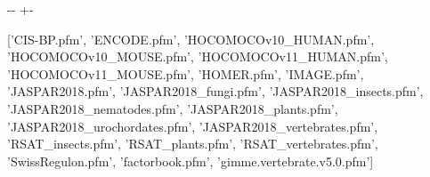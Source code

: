 \documentclass[letterpaper,10pt,english]{sphinxmanual}
\newlength\nbsphinxcodecellspacing
\begin{document}
{
\begin{sphinxVerbatim}[commandchars=\\\{\}]
\llap{\color{nbsphinxin}[26]:\,\hspace{\fboxrule}\hspace{\fboxsep}}
  
   
  
  

  \PYG{p}{[}      \PYG{p}{]}
\end{sphinxVerbatim}
}

{

\kern-\sphinxverbatimsmallskipamount\kern-\baselineskip
\kern+\FrameHeightAdjust\kern-\fboxrule
\vspace{\nbsphinxcodecellspacing}

\begin{sphinxVerbatim}[commandchars=\\\{\}]
\llap{\color{nbsphinxout}[26]:\,\hspace{\fboxrule}\hspace{\fboxsep}}['CIS-BP.pfm',
 'ENCODE.pfm',
 'HOCOMOCOv10\_HUMAN.pfm',
 'HOCOMOCOv10\_MOUSE.pfm',
 'HOCOMOCOv11\_HUMAN.pfm',
 'HOCOMOCOv11\_MOUSE.pfm',
 'HOMER.pfm',
 'IMAGE.pfm',
 'JASPAR2018.pfm',
 'JASPAR2018\_fungi.pfm',
 'JASPAR2018\_insects.pfm',
 'JASPAR2018\_nematodes.pfm',
 'JASPAR2018\_plants.pfm',
 'JASPAR2018\_urochordates.pfm',
 'JASPAR2018\_vertebrates.pfm',
 'RSAT\_insects.pfm',
 'RSAT\_plants.pfm',
 'RSAT\_vertebrates.pfm',
 'SwissRegulon.pfm',
 'factorbook.pfm',
 'gimme.vertebrate.v5.0.pfm']
\end{sphinxVerbatim}
}
\end{document}
